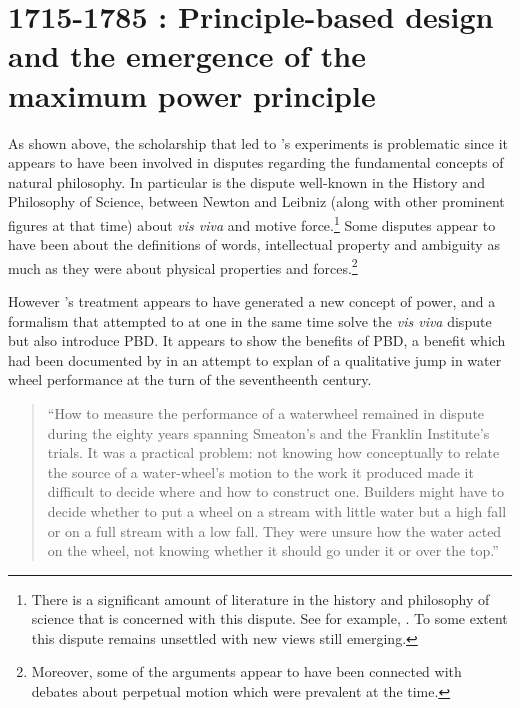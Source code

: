 \documentclass[a4paper, 12pt]{article}
\begin{document}
\section{1715-1785 \CE: Principle-based design and the emergence of the maximum power principle}
\label{sec:emerge:mpp}

As shown above, the scholarship that led to \citeauthor{smeaton_experimental_1759}'s experiments is problematic since it appears to have been involved in disputes regarding the fundamental concepts of natural philosophy. In particular is the dispute well-known in the History and Philosophy of Science, between Newton and Leibniz (along with other prominent figures at that time) about \textit{vis viva} and motive force.\footnote{There is a significant amount of literature in the history and philosophy of science that is concerned with this dispute. See for example, \citet{hankins_eighteenth-century_1965, cardwell_factors_1967, iltis_controversy_1967, iltis_alembert_1970, iltis_leibniz_1971, iltis_leibnizian-newtonian_1973, gale_leibniz_1973, laudan_vis_1968-4, smith_vis_2006, hepburn_euler_2010, shimony_leibniz_2010a, reichenberger_leibnizs_2012, morris_john_2018-1}. To some extent this dispute remains unsettled with new views still emerging.}  Some disputes appear to have been about the definitions of words, intellectual property and ambiguity as much as they were about physical properties and forces.\footnote{Moreover, some of the arguments appear to have been connected with debates about perpetual motion which were prevalent at the time.} 

However \citeauthor{smeaton_experimental_1759}'s treatment appears to have generated a new concept of power, and a formalism that attempted to at one in the same time solve the \textit{vis viva} dispute but also introduce PBD. It appears to show the benefits of PBD, a benefit which had been  documented by \citeauthor{desaguliers_course_1734} in an attempt to explan of a qualitative jump in water wheel performance at the turn of the seventheenth century. 


\begin{quotation}
    ``How to measure the performance of a waterwheel remained in dispute during the eighty years spanning Smeaton's and the Franklin Institute's trials. It was a practical problem: not knowing how conceptually to relate the source of a water-wheel's motion to the work it produced made it difficult to decide where and how to construct one. Builders might have to decide whether to put a wheel on a stream with little water but a high fall or on a full stream with a low fall. They were unsure how the water acted on the wheel, not knowing whether it should go under it or over the top.'' \citet[p.~17]{alexanderMantraEfficiencyWaterwheel2008} 
\end{quotation}
\end{document}
